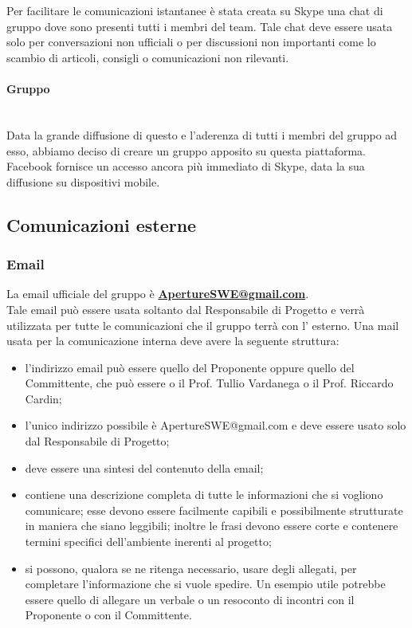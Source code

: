 \paragraph{} \hfill \\
Per facilitare le comunicazioni istantanee è stata creata su Skype una chat di gruppo dove sono presenti tutti i membri del team. Tale chat deve essere usata solo per conversazioni non ufficiali o per discussioni non importanti come lo scambio di articoli, consigli o comunicazioni non rilevanti.

\paragraph{Gruppo } \hfill \\
Data la grande diffusione di questo  e l'aderenza di tutti i membri del gruppo ad esso, abbiamo deciso di creare un gruppo apposito su questa piattaforma. Facebook fornisce un accesso ancora più immediato di Skype, data la sua diffusione su dispositivi mobile.

\subsection{Comunicazioni esterne}
\subsubsection{Email}
La email ufficiale del gruppo è \textbf{\url{ApertureSWE@gmail.com}}.\\
Tale email può essere usata soltanto dal Responsabile di Progetto e verrà utilizzata per tutte le comunicazioni che il gruppo terrà con l' esterno.
Una mail usata per la comunicazione interna deve avere la seguente struttura:
\begin{itemize}
\item {} l'indirizzo email può essere quello del Proponente oppure quello del Committente, che può essere o il Prof. Tullio Vardanega o il Prof. Riccardo Cardin;
\item {} l'unico indirizzo possibile è ApertureSWE@gmail.com e deve essere usato solo dal Responsabile di Progetto;
\item {} deve essere una sintesi del contenuto della email;
\item {} contiene una descrizione completa di tutte le informazioni che si vogliono comunicare; esse devono essere facilmente capibili e possibilmente strutturate in maniera che siano leggibili; inoltre le frasi devono essere corte e contenere termini specifici dell'ambiente  inerenti al progetto;
\item {} si possono, qualora se ne ritenga necessario, usare degli allegati, per completare l'informazione che si vuole spedire. Un esempio utile potrebbe essere quello di allegare un verbale o un resoconto di incontri con il Proponente  o con il Committente.
\end{itemize}


